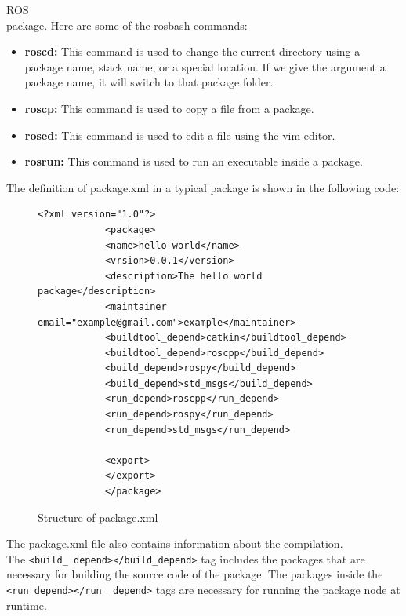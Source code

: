 \documentclass[../../main]{subfiles}
\begin{document}
ROS\\
package. Here are some of the rosbash commands:
\begin{itemize}
    \item
    \textbf{roscd:} This command is used to change the current directory using a
      package name, stack name, or a special location. If we give the
      argument a package name, it will switch to that package folder.
    \item
    \textbf{roscp:} This command is used to copy a file from a package.
    \item
    \textbf{rosed:} This command is used to edit a file using the vim editor.
    \item
    \textbf{rosrun:} This command is used to run an executable inside a package.
    \end{itemize}
    The definition of package.xml in a typical package is shown in the following
    code:
    \begin{figure}
        
        \begin{lstlisting}[style=xmlstyle]
            <?xml version="1.0"?>
            <package>
            <name>hello world</name>
            <vrsion>0.0.1</version>
            <description>The hello world package</description>
            <maintainer email="example@gmail.com">example</maintainer>
            <buildtool_depend>catkin</buildtool_depend>
            <buildtool_depend>roscpp</build_depend>
            <build_depend>rospy</build_depend>
            <build_depend>std_msgs</build_depend>
            <run_depend>roscpp</run_depend>
            <run_depend>rospy</run_depend>
            <run_depend>std_msgs</run_depend>
            
            <export>
            </export>
            </package>
        \end{lstlisting}
        \caption{Structure of package.xml}
    \end{figure}
        The package.xml file also contains information about the compilation.\\ The \texttt{<build\_
        depend></build\_depend>} tag includes the packages that are necessary for building
        the source code of the package. The packages inside the \texttt{<run\_depend></run\_
        depend>} tags are necessary for running the package node at runtime.
        \
\end{document}
